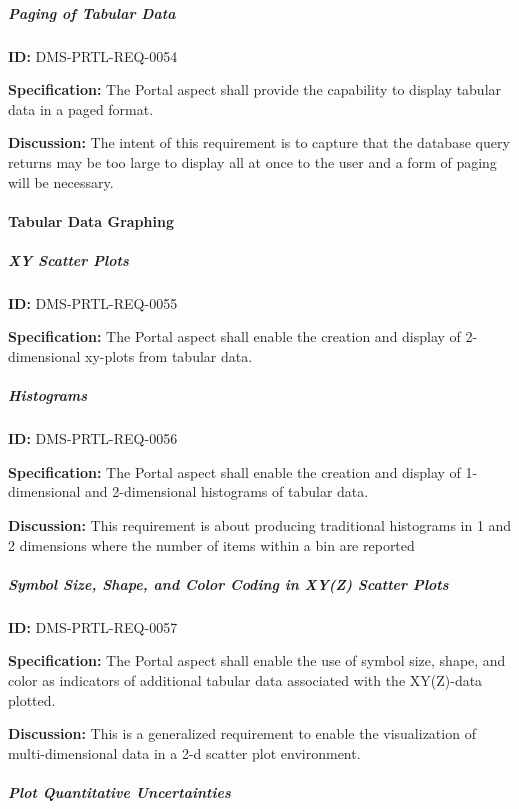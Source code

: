 \documentclass[SE,toc,lsstdraft]{lsstdoc}
\begin{document}
\subparagraph{Paging of Tabular Data}\hfill  %

\label{DMS-PRTL-REQ-0054}
\textbf{ID:} DMS-PRTL-REQ-0054

\textbf{Specification:}
The Portal aspect shall provide the capability to display tabular data in a paged format.

\textbf{Discussion:}
The intent of this requirement is to capture that the database query returns may be too large to display all at once to the user and a form of paging will be necessary.

\paragraph{Tabular Data Graphing}\hfill  %

\subparagraph{XY Scatter Plots}\hfill  %

\label{DMS-PRTL-REQ-0055}
\textbf{ID:} DMS-PRTL-REQ-0055

\textbf{Specification:}
The Portal aspect shall enable the creation and display of 2-dimensional xy-plots from tabular data.

\subparagraph{Histograms}\hfill  %

\label{DMS-PRTL-REQ-0056}
\textbf{ID:} DMS-PRTL-REQ-0056

\textbf{Specification:}
The Portal aspect shall enable the creation and display of 1-dimensional and 2-dimensional histograms of tabular data.

\textbf{Discussion:}
This requirement is about producing traditional histograms in 1 and 2 dimensions where the number of items within a bin are reported

\subparagraph{Symbol Size, Shape, and Color Coding in XY(Z) Scatter Plots}\hfill  %

\label{DMS-PRTL-REQ-0057}
\textbf{ID:} DMS-PRTL-REQ-0057

\textbf{Specification:}
The Portal aspect shall enable the use of symbol size, shape, and color as indicators of additional tabular data associated with the XY(Z)-data plotted.

\textbf{Discussion:}
This is a generalized requirement to enable the visualization of multi-dimensional data in a 2-d scatter plot environment.

\subparagraph{Plot Quantitative Uncertainties}\hfill  %
\end{document}
